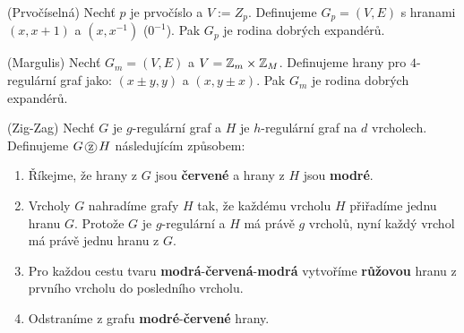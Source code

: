 \vt (Prvočíselná) Nechť $p$ je prvočíslo a $V:=Z_p$. Definujeme $G_p=(V,E)$ s 
hranami $(x, x+1)$ a $(x,x^{-1})$ ($0^{-1}$). Pak $G_p$ je rodina dobrých 
expandérů.

\vt (Margulis) Nechť $G_m=(V,E)$ a $V=\mathbb{Z}_m \times \mathbb{Z}_M$. Definujeme hrany pro 
$4$-regulární graf jako: $(x\pm y, y)$ a $(x,y\pm x)$. Pak $G_m$ je rodina 
dobrých expandérů.

\df (Zig-Zag) Nechť $G$ je $g$-regulární graf a $H$ je $h$-regulární graf na $d$ 
vrcholech. Definujeme $G \zz H$ následujícím způsobem:
\begin{enumerate}
	\item Říkejme, že hrany z $G$ jsou {\bf\color{red}červené} a hrany z $H$ 
		jsou {\bf\color{blue}modré}.
	\item Vrcholy $G$ nahradíme grafy $H$ tak, že každému vrcholu $H$ přiřadíme 
	jednu hranu $G$. Protože $G$ je $g$-regulární a $H$ má právě $g$ vrcholů, 
	nyní každý vrchol má právě jednu hranu z $G$.
	\item Pro každou cestu tvaru 
		{\bf\color{blue}modrá}-{\bf\color{red}červená}-{\bf\color{blue}modrá} 
		vytvoříme {\bf\color{magenta}růžovou} hranu z prvního vrcholu do 
		posledního vrcholu.
	\item Odstraníme z grafu {\bf\color{blue}modré}-{\bf\color{red}červené} 
		hrany.
\end{enumerate}

